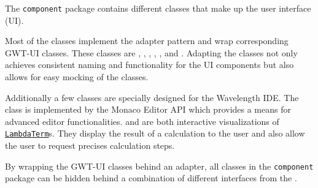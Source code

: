 The \texttt{component} package contains different classes that make up the user interface (UI).

Most of the classes implement the adapter pattern and wrap corresponding GWT-UI classes. 
These classes are \texttt{}, \texttt{}, \texttt{}, 
\texttt{}, \texttt{}, \texttt{} and \texttt{}.
Adapting the classes not only achieves consistent naming and functionality for the UI components
but also allows for easy mocking of the classes.

Additionally a few classes are specially designed for the Wavelength IDE. The \texttt{} 
class is implemented by the Monaco Editor API which provides a means for advanced editor functionalities. 
\texttt{} and \texttt{} are both interactive visualizations of 
\texttt{\hyperref[type:edu.kit.wavelength.client.model.term.LambdaTerm]{LambdaTerm}}s. They display 
the result of a calculation to the user and also allow the user to request precises calculation steps.

By wrapping the GWT-UI classes behind an adapter, all classes in the \texttt{component} package can
be hidden behind a combination of different interfaces from the \texttt{}.
